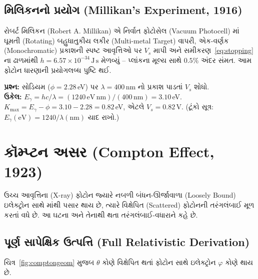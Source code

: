\subsection{મિલિકનનો પ્રયોગ (Millikan's Experiment, 1916)}

રોબર્ટ મિલિકન (Robert A. Millikan) એ નિર્વાત ફોટોસેલ (Vacuum Photocell) માં ઘૂમતી (Rotating)
બહુધાતુકીય લકીર (Multi-metal Target) વાપરી, એક-વર્ણક (Monochromatic) પ્રકાશની સ્પષ્ટ આવૃત્તિઓ પર
$V_s$ માપી અને સમીકરણ~\eqref{eq:stopping} ના ઢાળમાંથી
$h=6.57\times10^{-34}\,\mathrm{J\,s}$ મેળવ્યું -- પ્લાંકના મૂલ્ય સાથે $0.5\%$ અંદર સંમત.
આમ ફોટોન ધારણાની પ્રયોગલબ્ધ પુષ્ટિ થઈ.

\begin{udaharan}[1.3]
\textbf{પ્રશ્ન:} સોડિયમ ($\phi=2.28\,$eV) પર $\lambda=400\,$nm નો પ્રકાશ પાડતાં $V_s$ શોધો.\\[1mm]
\textbf{ઉકેલ:} $E_\gamma=hc/\lambda=(1240\,\mathrm{eV\,nm})/(400\,\mathrm{nm})=3.10\,$eV.
$K_{\max}=E_\gamma-\phi=3.10-2.28=0.82\,$eV, એટલે $V_s=0.82\,$V.
(ટૂંકો સૂત્ર: $E_\gamma(\mathrm{eV})=1240/\lambda(\mathrm{nm})$ યાદ રાખો.)
\end{udaharan}

\section{કૉમ્પ્ટન અસર (Compton Effect, 1923)}

\begin{vyakhya}
ઉચ્ચ આવૃત્તિના (X-ray) ફોટોન જ્યારે નબળી બંધન-ઊર્જાવાળા (Loosely Bound) ઇલેક્ટ્રોન સાથે
 માંથી પસાર થાય છે, ત્યારે વિક્ષેપિત (Scattered) ફોટોનની
તરંગલંબાઈ મૂળ કરતાં વધે છે. આ ઘટના અને તેનાથી થતા તરંગલંબાઈ-વધારાને
 કહે છે.
\end{vyakhya}

\subsection{પૂર્ણ સાપેક્ષિક ઉત્પત્તિ (Full Relativistic Derivation)}

ચિત્ર~\ref{fig:comptongeom} મુજબ $\theta$ કોણે વિક્ષેપિત થતાં ફોટોન સાથે ઇલેક્ટ્રોન $\varphi$ કોણે
 થાય છે.

